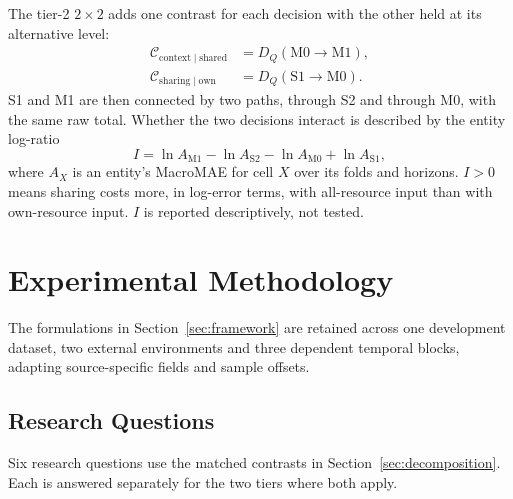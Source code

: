 \documentclass[5p,twocolumn]{elsarticle}
\begin{document}
The tier-2 $2\times2$ adds one contrast for each decision with the other
held at its alternative level:
\begin{equation}
  \begin{aligned}
    \mathcal{C}_{\mathrm{context}\mid\mathrm{shared}}
      &= D_Q(\mathrm{M0}\rightarrow\mathrm{M1}), \\
    \mathcal{C}_{\mathrm{sharing}\mid\mathrm{own}}
      &= D_Q(\mathrm{S1}\rightarrow\mathrm{M0}).
  \end{aligned}
  \label{eq:tier2-contrasts}
\end{equation}
S1 and M1 are then connected by two paths, through S2 and through M0, with
the same raw total. Whether the two decisions interact is described by the
entity log-ratio
\begin{equation}
  I=\ln A_{\mathrm{M1}}-\ln A_{\mathrm{S2}}-\ln A_{\mathrm{M0}}
    +\ln A_{\mathrm{S1}},
  \label{eq:interaction}
\end{equation}
where $A_X$ is an entity's MacroMAE for cell $X$ over its folds and horizons.
$I>0$ means sharing costs more, in log-error terms, with all-resource input
than with own-resource input. $I$ is reported descriptively, not tested.

\section{Experimental Methodology}
\label{sec:methodology}

The formulations in Section~\ref{sec:framework} are retained across one
development dataset, two external environments and three dependent temporal
blocks, adapting source-specific fields and sample offsets.

\subsection{Research Questions}
\label{sec:research-questions}

Six research questions use the matched contrasts in
Section~\ref{sec:decomposition}. Each is answered separately for the two
tiers where both apply.
\end{document}
